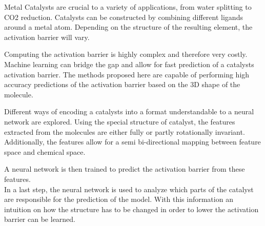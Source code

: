 
\Abstract

Metal Catalysts are crucial to a variety of applications, from water splitting to CO2 reduction. %
Catalysts can be constructed by combining different ligands around a metal atom.
Depending on the structure of the resulting element, the activation barrier will vary.

Computing the activation barrier is highly complex and therefore very costly. 
Machine learning can bridge the gap and allow for fast prediction of a catalysts activation barrier.
The methods proposed here are capable of performing high accuracy predictions of the activation barrier based on
the 3D shape of the molecule.

Different ways of encoding a catalysts into a format understandable to a neural network are explored.
Using the special structure of catalyst, the features extracted from the molecules are either fully or partly rotationally invariant.
Additionally, the features allow for a semi bi-directional mapping between feature space and chemical space.

A neural network is then trained to predict the activation barrier from these features.
\\

In a last step, the neural network is used to analyze which parts of the catalyst are responsible for the prediction of the model.
With this information an intuition on how the structure has to be changed in order to lower the activation barrier can be learned.
